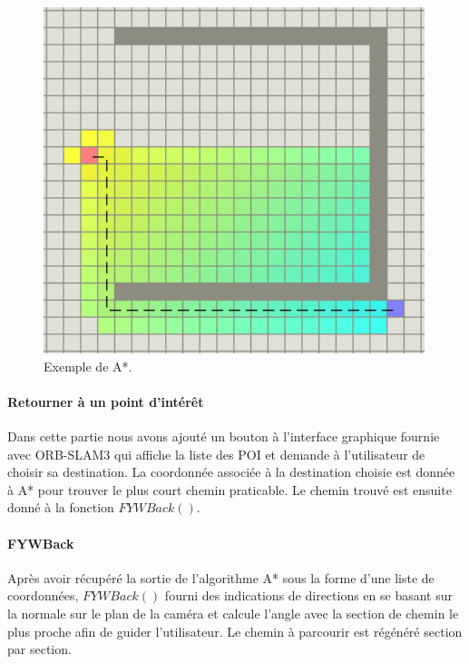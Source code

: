 \documentclass[11pt]{article}
\begin{document}
          \clearpage
          
          \begin{figure}[hbt]  
            \includegraphics[width=\textwidth]{Astar.png}    
            \caption{Exemple de A*.}
            \label{fig:Astar}
          \end{figure}      

        \paragraph{Retourner à un point d'intérêt}
          Dans cette partie nous avons ajouté un bouton à l'interface graphique fournie avec ORB-SLAM3 qui affiche la liste des POI et 
          demande à l'utilisateur de choisir sa destination. La coordonnée associée à la destination choisie est donnée à A* pour trouver
          le plus court chemin praticable. Le chemin trouvé est ensuite donné à la fonction $FYWBack()$.          

        \paragraph{FYWBack}
            Après avoir récupéré la sortie de l'algorithme A* sous la forme d'une liste de coordonnées, $FYWBack()$ fourni des indications
            de directions en se basant sur la normale sur le plan de la caméra et calcule l'angle avec la section de chemin le plus proche
            afin de guider l'utilisateur. Le chemin à parcourir est régénéré section par section.            
      
\end{document}
